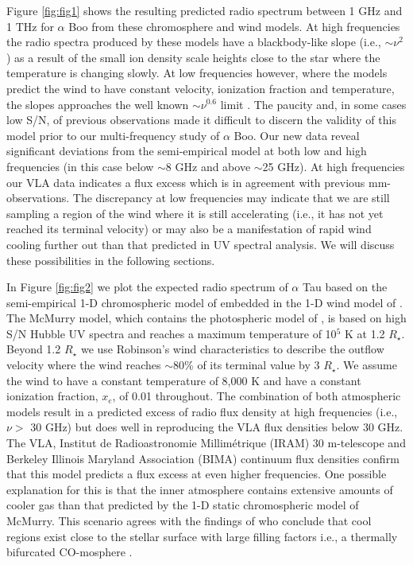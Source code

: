 \documentclass[iop]{emulateapj}
\begin{document}
Figure \ref{fig:fig1} shows the resulting predicted radio spectrum between 1 GHz and 1 THz for $\alpha$ Boo from these chromosphere and wind models. At high frequencies the radio spectra produced by these models have a blackbody-like slope (i.e., $\sim\nu ^{2}$) as a result of the small ion density scale heights close to the star where the temperature is changing slowly. At low frequencies however, where the models predict the wind to have constant velocity, ionization fraction and temperature, the slopes approaches the well known $\sim\nu ^{0.6}$ limit \citep{1975MNRAS.170...41W,1975AA....39..217O,1975AA....39....1P}. The paucity and, in some cases low S/N, of previous observations made it difficult to discern the validity of this model prior to our multi-frequency study of $\alpha$ Boo. Our new data reveal significant deviations from the semi-empirical model at both low and high frequencies (in this case below $\sim$8 GHz and above $\sim$25 GHz). At high frequencies our VLA data indicates a flux excess which is in agreement with previous mm-observations. The discrepancy at low frequencies may indicate that we are still sampling a region of the wind where it is still accelerating (i.e., it has not yet reached its terminal velocity) or may also be a manifestation of rapid wind cooling further out than that predicted in UV spectral analysis. We will discuss these possibilities in the following sections. 

In Figure \ref{fig:fig2} we plot the expected radio spectrum of $\alpha$ Tau based on the semi-empirical 1-D chromospheric model of \cite{1999MNRAS.302...37M} embedded in the 1-D wind model of \cite{1998ApJ...503..396R}. The McMurry model, which contains  the photospheric model of \cite{1973ApJ...180...81J}, is based on high S/N Hubble UV spectra and reaches a maximum temperature of 10$^{5}$ K at 1.2 $R_{\star}$. Beyond 1.2 $R_{\star}$ we use Robinson's wind characteristics to describe the outflow velocity where the wind reaches $\sim$80\% of its terminal value by 3 $R_{\star}$. We assume the wind to have a constant temperature of 8,000 K and have a constant ionization fraction, $x_{e}$, of 0.01 throughout. The combination of both atmospheric models result in a predicted excess of radio flux density at high frequencies (i.e., $\nu >$ 30 GHz) but does well in reproducing the VLA flux densities below 30 GHz. The VLA, Institut de Radioastronomie Millim\'{e}trique (IRAM) 30 m-telescope and Berkeley Illinois Maryland Association (BIMA) continuum flux densities confirm that this model predicts a flux excess at even higher frequencies. One possible explanation for this is that the inner atmosphere contains extensive amounts of cooler gas than that predicted by the 1-D static chromospheric model of McMurry. This scenario agrees with the findings of \cite{1994ApJ...423..806W} who conclude that cool regions exist close to the stellar surface with large filling factors i.e., a thermally bifurcated CO-mosphere \citep{1996IAUS..176..371A}.
\end{document}
